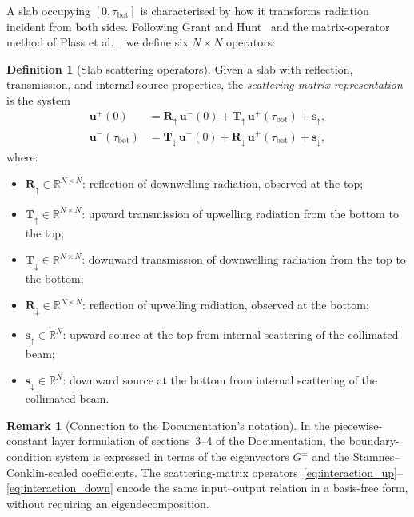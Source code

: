 \documentclass[11pt,a4paper]{article}
\newcommand{\R}{\mathbb{R}}
\newcommand{\vect}[1]{\bm{#1}}
\newcommand{\mat}[1]{\mathbf{#1}}
\newcommand{\tbot}{\tau_{\mathrm{bot}}}
\theoremstyle{definition}
\newtheorem{remark}{Remark}
\newtheorem{definition}{Definition}
\begin{document}
A slab occupying $[0,\tbot]$ is characterised by how it transforms
radiation incident from both sides.  Following Grant and
Hunt~\cite{grant1969} and the matrix-operator method of Plass et
al.~\cite{plass1973}, we define six $N\!\times\!N$ operators:
\begin{definition}[Slab scattering operators]\label{def:slab_ops}
Given a slab with reflection, transmission, and internal source
properties, the \emph{scattering-matrix representation} is the
system
\begin{align}
  \vect{u}^+(0) &= \mat{R}_\uparrow\,\vect{u}^-(0)
                  + \mat{T}_\uparrow\,\vect{u}^+(\tbot)
                  + \vect{s}_\uparrow, \label{eq:interaction_up}\\
  \vect{u}^-(\tbot) &= \mat{T}_\downarrow\,\vect{u}^-(0)
                      + \mat{R}_\downarrow\,\vect{u}^+(\tbot)
                      + \vect{s}_\downarrow, \label{eq:interaction_down}
\end{align}
where:
\begin{itemize}[nosep]
\item $\mat{R}_\uparrow\in\R^{N\times N}$:
  reflection of downwelling radiation, observed at the top;
\item $\mat{T}_\uparrow\in\R^{N\times N}$:
  upward transmission of upwelling radiation from the bottom to the top;
\item $\mat{T}_\downarrow\in\R^{N\times N}$:
  downward transmission of downwelling radiation from the top to the bottom;
\item $\mat{R}_\downarrow\in\R^{N\times N}$:
  reflection of upwelling radiation, observed at the bottom;
\item $\vect{s}_\uparrow\in\R^N$:
  upward source at the top from internal scattering of the
  collimated beam;
\item $\vect{s}_\downarrow\in\R^N$:
  downward source at the bottom from internal scattering of the
  collimated beam.
\end{itemize}
\end{definition}

\begin{remark}[Connection to the Documentation's notation]
In the piecewise-constant layer formulation of sections~3--4 of the
Documentation, the boundary-condition system is expressed in terms of
the eigenvectors $G^{\pm}$ and the Stamnes--Conklin-scaled
coefficients.  The scattering-matrix
operators~\eqref{eq:interaction_up}--\eqref{eq:interaction_down}
encode the same input--output relation in a basis-free form, without
requiring an eigendecomposition.
\end{remark}
\end{document}
